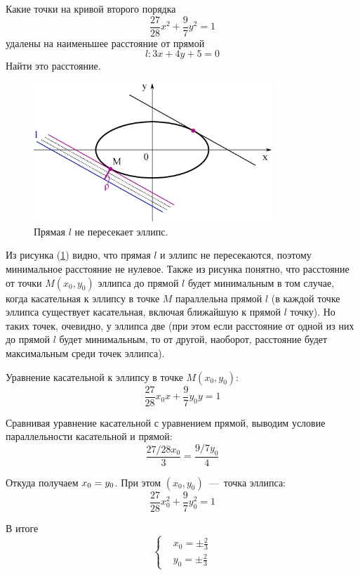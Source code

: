 \documentclass[a4paper,12pt]{article}
\begin{document}
  Какие точки на кривой второго порядка
  \[
    \frac{27}{28} x^2 + \frac{9}{7} y^2 = 1
  \]
  удалены на наименьшее расстояние от прямой
  \[
    l\colon 3x + 4y + 5 = 0
  \]
  Найти это расстояние.
  
  \begin{solution}
    \begin{figure}[h]
      \centering

      \includegraphics[width=0.8\textwidth]{ellipse-8-9}
    
      \caption{Прямая $l$ не пересекает эллипс.}
      \label{fig:ellipse-8-9}
    \end{figure}
    
    Из рисунка (\ref{fig:ellipse-8-9}) видно, что прямая $l$ и эллипс не пересекаются, поэтому минимальное расстояние не нулевое.
    Также из рисунка понятно, что расстояние от точки $M(x_0, y_0)$ эллипса до прямой $l$ будет минимальным в том случае, когда касательная к эллипсу в точке $M$ параллельна прямой $l$ (в каждой точке эллипса существует касательная, включая ближайшую к прямой $l$ точку).
    Но таких точек, очевидно, у эллипса две (при этом если расстояние от одной из них до прямой $l$ будет минимальным, то от другой, наоборот, расстояние будет максимальным среди точек эллипса).
    
    Уравнение касательной к эллипсу в точке $M(x_0, y_0)$:
    \[
      \frac{27}{28} x_0 x + \frac{9}{7} y_0 y = 1
    \]
    
    Сравнивая уравнение касательной с уравнением прямой, выводим условие параллельности касательной и прямой:
    \[
      \frac{27/28 x_0}{3} = \frac{9/7 y_0}{4}
    \]
    
    Откуда получаем
    $
      x_0 \hm= y_0
    $.
    При этом $(x_0, y_0)$~---~точка эллипса:
    \[
      \frac{27}{28} x_0^2 + \frac{9}{7} y_0^2 = 1
    \]
    
    В итоге
    \[
      \left\{
        \begin{aligned}
          &x_0 = \pm \frac{2}{3}\\
          &y_0 = \pm \frac{2}{3}
        \end{aligned}
      \right.
    \]
    

\end{solution}
\end{document}
